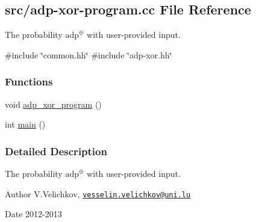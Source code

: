 \hypertarget{adp-xor-program_8cc}{\subsection{src/adp-\/xor-\/program.cc \-File \-Reference}
\label{adp-xor-program_8cc}
}


\-The probability $\mathrm{adp}^{\oplus}$ with user-\/provided input.  


{\ttfamily \#include \char`\"{}common.\-hh\char`\"{}}\*
{\ttfamily \#include \char`\"{}adp-\/xor.\-hh\char`\"{}}\*
\subsubsection*{\-Functions}
\begin{DoxyCompactItemize}
\item 
void \hyperlink{adp-xor-program_8cc_acaac62cba47322c97652cc5348e2309d}{adp\-\_\-xor\-\_\-program} ()
\item 
int \hyperlink{adp-xor-program_8cc_ae66f6b31b5ad750f1fe042a706a4e3d4}{main} ()
\end{DoxyCompactItemize}


\subsubsection{\-Detailed \-Description}
\-The probability $\mathrm{adp}^{\oplus}$ with user-\/provided input. \begin{DoxyAuthor}{\-Author}
\-V.\-Velichkov, \href{mailto:vesselin.velichkov@uni.lu}{\tt vesselin.\-velichkov@uni.\-lu} 
\end{DoxyAuthor}
\begin{DoxyDate}{\-Date}
2012-\/2013 
\end{DoxyDate}


